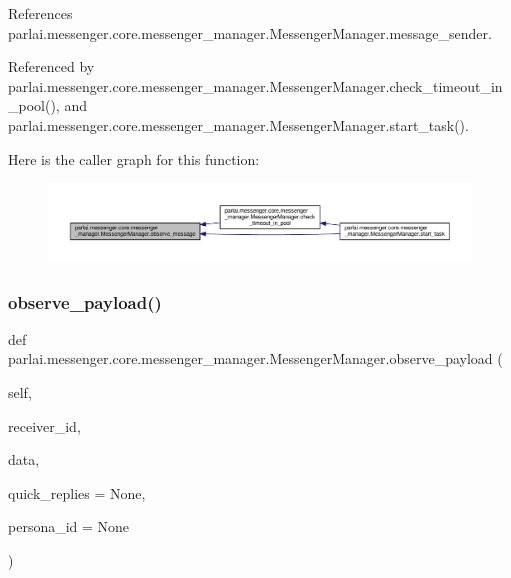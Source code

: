References parlai.\+messenger.\+core.\+messenger\+\_\+manager.\+Messenger\+Manager.\+message\+\_\+sender.



Referenced by parlai.\+messenger.\+core.\+messenger\+\_\+manager.\+Messenger\+Manager.\+check\+\_\+timeout\+\_\+in\+\_\+pool(), and parlai.\+messenger.\+core.\+messenger\+\_\+manager.\+Messenger\+Manager.\+start\+\_\+task().

Here is the caller graph for this function\+:
\nopagebreak
\begin{figure}[H]
\begin{center}
\leavevmode
\includegraphics[width=350pt]{classparlai_1_1messenger_1_1core_1_1messenger__manager_1_1MessengerManager_a71506a682b9284d8ae4121576e6140db_icgraph}
\end{center}
\end{figure}
\mbox{\label{classparlai_1_1messenger_1_1core_1_1messenger__manager_1_1MessengerManager_a6fd0d7046fe2c86064cc8abdd0d45077}} 
\subsubsection{\texorpdfstring{observe\+\_\+payload()}{observe\_payload()}}
{\footnotesize\ttfamily def parlai.\+messenger.\+core.\+messenger\+\_\+manager.\+Messenger\+Manager.\+observe\+\_\+payload (\begin{DoxyParamCaption}\item[{}]{self,  }\item[{}]{receiver\+\_\+id,  }\item[{}]{data,  }\item[{}]{quick\+\_\+replies = {\ttfamily None},  }\item[{}]{persona\+\_\+id = {\ttfamily None} }\end{DoxyParamCaption})}

